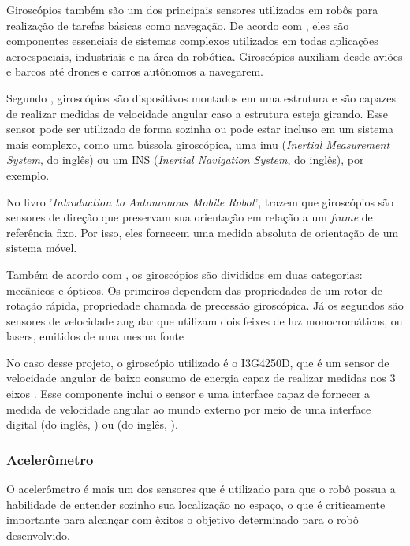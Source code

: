 \documentclass[acronym, symbols, table]{fei}
\begin{document}
				Giroscópios também são um dos principais sensores utilizados em robôs para realização de tarefas básicas como navegação. De acordo com \textcite{jeremydingman2020}, eles são componentes essenciais de sistemas complexos utilizados em todas aplicações aeroespaciais, industriais e na área da robótica. Giroscópios auxiliam desde aviões e barcos até drones e carros autônomos a navegarem.
				
				Segundo \textcite{s17102284}, giroscópios são dispositivos montados em uma estrutura e são capazes de realizar medidas de velocidade angular caso a estrutura esteja girando. Esse sensor pode ser utilizado de forma sozinha ou pode estar incluso em um sistema mais complexo, como uma bússola giroscópica, uma \acrshort{imu} (\textit{Inertial Measurement System}, do inglês) ou um INS (\textit{Inertial Navigation System}, do inglês), por exemplo.
				
				No livro '\textit{Introduction to Autonomous Mobile Robot}', \textcite{siegwart2011introduction} trazem que giroscópios são sensores de direção que preservam sua orientação em relação a um \textit{frame} de referência fixo. Por isso, eles fornecem uma medida absoluta de orientação de um sistema móvel. 
				
				Também de acordo com \textcite{siegwart2011introduction}, os giroscópios são divididos em duas categorias: mecânicos e ópticos. Os primeiros dependem das propriedades de um rotor de rotação rápida, propriedade chamada de precessão giroscópica. Já os segundos são sensores de velocidade angular que utilizam dois feixes de luz monocromáticos, ou lasers, emitidos de uma mesma fonte
				
				No caso desse projeto, o giroscópio utilizado é o I3G4250D, que é um sensor de velocidade angular de baixo consumo de energia capaz de realizar medidas nos 3 eixos \cite{datasheet_gyro}. Esse componente inclui o sensor e uma interface capaz de fornecer a medida de velocidade angular ao mundo externo por meio de uma interface digital  (do inglês, ) ou  (do inglês, ).
			
			\subsubsection{Acelerômetro} \label{sec:sensores_acelerometro}
			
				O acelerômetro é mais um dos sensores que é utilizado para que o robô possua a habilidade de entender sozinho sua localização no espaço, o que é criticamente importante para alcançar com êxitos o objetivo determinado para o robô desenvolvido.
			
\end{document}
